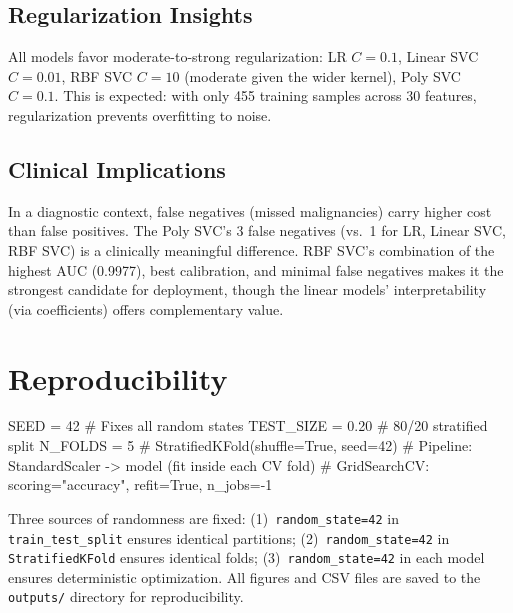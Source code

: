\documentclass[10pt, letterpaper]{article}
\begin{document}
\subsection{Regularization Insights}

All models favor moderate-to-strong regularization:
LR $C{=}0.1$, Linear SVC $C{=}0.01$, RBF SVC $C{=}10$ (moderate given the wider kernel), Poly SVC $C{=}0.1$.
This is expected: with only 455 training samples across 30 features, regularization prevents overfitting to noise.

\subsection{Clinical Implications}

In a diagnostic context, false negatives (missed malignancies) carry higher cost than false positives.
The Poly SVC's 3 false negatives (vs.\ 1 for LR, Linear SVC, RBF SVC) is a clinically meaningful difference.
RBF SVC's combination of the highest AUC (0.9977), best calibration, and minimal false negatives makes it the strongest candidate for deployment, though the linear models' interpretability (via coefficients) offers complementary value.

\section{Reproducibility}

\begin{code}
SEED      = 42            # Fixes all random states
TEST_SIZE = 0.20          # 80/20 stratified split
N_FOLDS   = 5             # StratifiedKFold(shuffle=True, seed=42)
# Pipeline: StandardScaler -> model (fit inside each CV fold)
# GridSearchCV: scoring="accuracy", refit=True, n_jobs=-1
\end{code}

Three sources of randomness are fixed:
(1)~\texttt{random\_state=42} in \texttt{train\_test\_split} ensures identical partitions;
(2)~\texttt{random\_state=42} in \texttt{StratifiedKFold} ensures identical folds;
(3)~\texttt{random\_state=42} in each model ensures deterministic optimization.
All figures and CSV files are saved to the \texttt{outputs/} directory for reproducibility.
\end{document}
